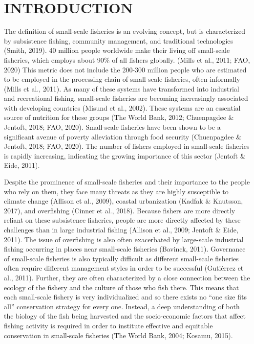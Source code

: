 \documentclass[
  12pt,
]{article}
\begin{document}
\newpage


\hypertarget{introduction}{%
\section{INTRODUCTION}\label{introduction}}

The definition of small-scale fisheries is an evolving concept, but is characterized by subsistence fishing, community management, and traditional technologies (Smith, 2019). 40 million people worldwide make their living off small-scale fisheries, which employs about 90\% of all fishers globally. (Mills et al., 2011; FAO, 2020) This metric does not include the 200-300 million people who are estimated to be employed in the processing chain of small-scale fisheries, often informally (Mills et al., 2011). As many of these systems have transformed into industrial and recreational fishing, small-scale fisheries are becoming increasingly associated with developing countries (Misund et al., 2002). These systems are an essential source of nutrition for these groups (The World Bank, 2012; Chuenpagdee \& Jentoft, 2018; FAO, 2020). Small-scale fisheries have been shown to be a significant avenue of poverty alleviation through food security (Chuenpagdee \& Jentoft, 2018; FAO, 2020). The number of fishers employed in small-scale fisheries is rapidly increasing, indicating the growing importance of this sector (Jentoft \& Eide, 2011).

Despite the prominence of small-scale fisheries and their importance to the people who rely on them, they face many threats as they are highly susceptible to climate change (Allison et al., 2009), coastal urbanization (Kadfak \& Knutsson, 2017), and overfishing (Cinner et al., 2018). Because fishers are more directly reliant on these subsistence fisheries, people are more directly affected by these challenges than in large industrial fishing (Allison et al., 2009; Jentoft \& Eide, 2011). The issue of overfishing is also often exacerbated by large-scale industrial fishing occurring in places near small-scale fisheries (Bavinck, 2011). Governance of small-scale fisheries is also typically difficult as different small-scale fisheries often require different management styles in order to be successful (Gutiérrez et al., 2011). Further, they are often characterized by a close connection between the ecology of the fishery and the culture of those who fish there. This means that each small-scale fishery is very individualized and so there exists no ``one size fits all'' conservation strategy for every one. Instead, a deep understanding of both the biology of the fish being harvested and the socio-economic factors that affect fishing activity is required in order to institute effective and equitable conservation in small-scale fisheries (The World Bank, 2004; Kosamu, 2015).
\end{document}
